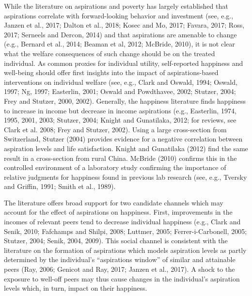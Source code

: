 \documentclass[11.5pt]{article}
\begin{document}
While the literature on aspirations and poverty has largely established that aspirations correlate with forward-looking behavior and investment (see, e.g., Janzen et al., 2017; Dalton et al., 2018; Kosec and Mo, 2017; Favara, 2017; Ross, 2017; Serneels and Dercon, 2014) and that aspirations are amenable to change (e.g., Bernard et al., 2014; Beaman et al, 2012; McBride, 2010), it is not clear what the welfare consequences of such change should be on the treated individual. As common proxies for individual utility, self-reported happiness and well-being should offer first insights into the impact of aspirations-based interventions on individual welfare (see, e.g., Clark and Oswald, 1994; Oswald, 1997; Ng, 1997; Easterlin, 2001; Oswald and Powdthavee, 2002; Stutzer, 2004; Frey and Stutzer, 2000, 2002). Generally, the happiness literature finds happiness to increase in income but decrease in income aspirations (e.g., Easterlin, 1974, 1995, 2001, 2003; Stutzer, 2004; Knight and Gunatilaka, 2012; for reviews, see Clark et al. 2008; Frey and Stutzer, 2002). Using a large cross-section from Switzerland, Stutzer (2004) provides evidence for a negative correlation between aspiration levels and life satisfaction. Knight and Gunatilaka (2012) find the same result in a cross-section from rural China. McBride (2010) confirms this in the controlled environment of a laboratory study confirming the importance of relative judgments for happiness found in previous lab research (see, e.g., Tversky and Griffin, 1991; Smith et al., 1989). 

The literature offers broad support for two candidate channels which may account for the effect of aspirations on happiness. First, improvements in the incomes of relevant peers tend to decrease individual happiness (e.g., Clark and Senik, 2010; Fafchamps and Shilpi, 2008; Luttmer, 2005; Ferrer-i-Carbonell, 2005; Stutzer, 2004; Senik, 2004, 2009). This social channel is consistent with the literature on the formation of aspirations which models aspiration levels as partly determined by the individual's ``aspirations window'' of similar and attainable peers (Ray, 2006; Genicot and Ray, 2017; Janzen et al., 2017). A shock to the exposure to well-off peers may thus cause changes in the individual's aspiration levels which, in turn, impact on their happiness. 
\end{document}
